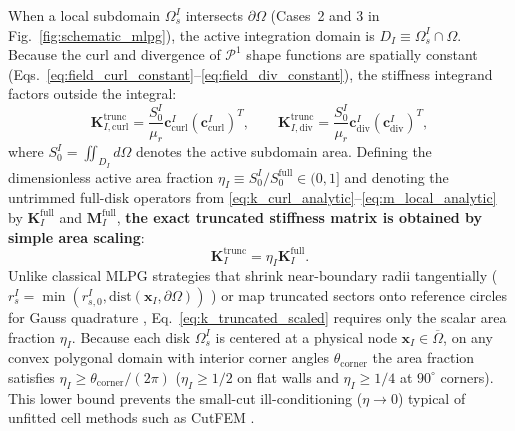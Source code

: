 \documentclass[VANCOUVER]{USG}
\begin{document}
When a local subdomain $\Omega_s^I$ intersects $\partial\Omega$ (Cases~2 and 3 in Fig.~\ref{fig:schematic_mlpg}), the active integration domain is $D_I \equiv \Omega_s^I \cap \Omega$. Because the curl and divergence of $\mathcal{P}^1$ shape functions are spatially constant (Eqs.~\eqref{eq:field_curl_constant}--\eqref{eq:field_div_constant}), the stiffness integrand factors outside the integral:
\begin{equation}
    \mathbf{K}_{I, \mathrm{curl}}^{\mathrm{trunc}} = \frac{S_0^I}{\mu_r} \mathbf{c}_{\mathrm{curl}}^I (\mathbf{c}_{\mathrm{curl}}^I)^T, \qquad
    \mathbf{K}_{I, \mathrm{div}}^{\mathrm{trunc}} = \frac{S_0^I}{\mu_r} \mathbf{c}_{\mathrm{div}}^I (\mathbf{c}_{\mathrm{div}}^I)^T,
    \label{eq:k_curl_truncated}
\end{equation}
where $S_0^I = \iint_{D_I} d\Omega$ denotes the active subdomain area. Defining the dimensionless active area fraction $\eta_I \equiv S_0^I / S_0^{\mathrm{full}} \in (0, 1]$ and denoting the untrimmed full-disk operators from \eqref{eq:k_curl_analytic}--\eqref{eq:m_local_analytic} by $\mathbf{K}_I^{\mathrm{full}}$ and $\mathbf{M}_I^{\mathrm{full}}$, \textbf{the exact truncated stiffness matrix is obtained by simple area scaling}:
\begin{equation}
    \mathbf{K}_I^{\mathrm{trunc}} = \eta_I \mathbf{K}_I^{\mathrm{full}}.
    \label{eq:k_truncated_scaled}
\end{equation}
Unlike classical MLPG strategies that shrink near-boundary radii tangentially ($r_s^I = \min(r_{s,0}^I, \mathrm{dist}(\mathbf{x}_I, \partial\Omega))$ \cite{atluri2002meshless}) or map truncated sectors onto reference circles for Gauss quadrature \cite{atluri2004meshless}, Eq.~\eqref{eq:k_truncated_scaled} requires only the scalar area fraction $\eta_I$. Because each disk $\Omega_s^I$ is centered at a physical node $\mathbf{x}_I \in \overline{\Omega}$, on any convex polygonal domain with interior corner angles $\theta_{\mathrm{corner}}$ the area fraction satisfies $\eta_I \ge \theta_{\mathrm{corner}}/(2\pi)$ ($\eta_I \ge 1/2$ on flat walls and $\eta_I \ge 1/4$ at $90^\circ$ corners). This lower bound prevents the small-cut ill-conditioning ($\eta \to 0$) typical of unfitted cell methods such as CutFEM \cite{hansbo2002unfitted}.
\end{document}
